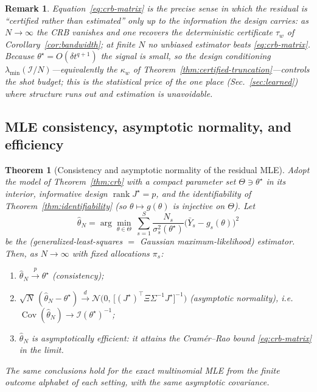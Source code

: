 \documentclass[aps,prxquantum,reprint,superscriptaddress,nofootinbib,amsmath,amssymb]{revtex4-2}
\newcommand{\dt}{\delta t}
\newtheorem{theorem}{Theorem}
\newtheorem{remark}{Remark}
\begin{document}
\begin{remark}
Equation~\eqref{eq:crb-matrix} is the precise sense in which the residual is ``certified rather than estimated'' only up to the information the design carries: as $N\to\infty$ the CRB vanishes and one recovers the deterministic certificate $\tau_w$ of Corollary~\ref{cor:bandwidth}; at finite $N$ no unbiased estimator beats \eqref{eq:crb-matrix}. Because $\theta^\star=O(\dt^{q+1})$ the signal is small, so the design conditioning $\lambda_{\min}(\mathcal{I}/N)$---equivalently the $\kappa_w$ of Theorem~\ref{thm:certified-truncation}---controls the shot budget; this is the statistical price of the one place (Sec.~\ref{sec:learned}) where structure runs out and estimation is unavoidable.
\end{remark}

\subsection{MLE consistency, asymptotic normality, and efficiency}
\label{app:inference-mle}

\begin{theorem}[Consistency and asymptotic normality of the residual MLE]
\label{thm:mle}
Adopt the model of Theorem~\ref{thm:crb} with a compact parameter set $\Theta\ni\theta^\star$ in its interior, informative design $\operatorname{rank}J^\star=p$, and the identifiability of Theorem~\ref{thm:identifiability} (so $\theta\mapsto g(\theta)$ is injective on $\Theta$). Let
\begin{equation}
    \hat\theta_N=\arg\min_{\theta\in\Theta}\ \sum_{s=1}^{S}\frac{N_s}{\sigma_s^2(\theta^\star)}\bigl(\bar Y_s-g_s(\theta)\bigr)^2
    \label{eq:gls}
\end{equation}
be the (generalized-least-squares $=$ Gaussian maximum-likelihood) estimator. Then, as $N\to\infty$ with fixed allocations $\pi_s$:
\begin{enumerate}
\item[(i)] $\hat\theta_N\xrightarrow{\ p\ }\theta^\star$ (consistency);
\item[(ii)] $\sqrt N\,(\hat\theta_N-\theta^\star)\xrightarrow{\ d\ }\mathcal{N}\!\bigl(0,\,\bigl[(J^\star)^\top\Xi\Sigma^{-1}J^\star\bigr]^{-1}\bigr)$ (asymptotic normality), i.e.\ $\operatorname{Cov}(\hat\theta_N)\to\mathcal{I}(\theta^\star)^{-1}$;
\item[(iii)] $\hat\theta_N$ is asymptotically efficient: it attains the Cram\'er--Rao bound \eqref{eq:crb-matrix} in the limit.
\end{enumerate}
The same conclusions hold for the exact multinomial MLE from the finite outcome alphabet of each setting, with the same asymptotic covariance.
\end{theorem}
\end{document}
